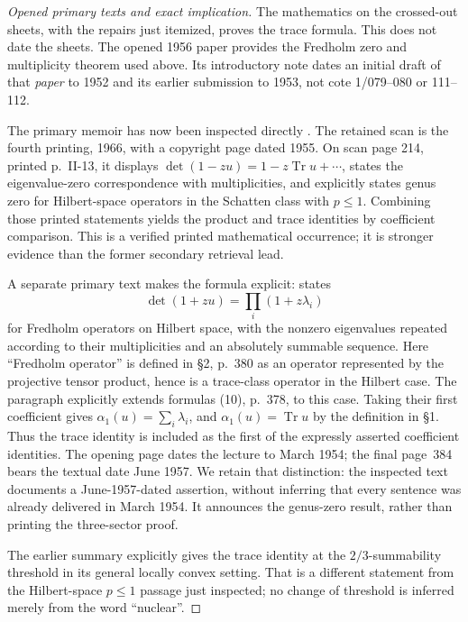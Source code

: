 \begin{proof}[Opened primary texts and exact implication]
The mathematics on the crossed-out sheets, with the repairs just itemized,
proves the trace formula. This does not date the sheets. The opened 1956
paper provides the Fredholm zero and multiplicity theorem used above. Its
introductory note dates an initial draft of that \emph{paper} to 1952 and
its earlier submission to 1953, not cote 1/079--080 or 111--112.

The primary memoir has now been inspected directly
\cite[Chapter II, \S1, no.~4, printed p.~13]{Grothendieck1955Memoir}.
The retained scan is the fourth printing, 1966, with a copyright page dated
1955. On scan page 214, printed p.~II-13, it displays
$\det(1-zu)=1-z\operatorname{Tr}u+\cdots$, states the eigenvalue-zero
correspondence with multiplicities, and explicitly states genus zero for
Hilbert-space operators in the Schatten class with $p\leq1$. Combining
those printed statements yields the product and trace identities by
coefficient comparison. This is a verified printed mathematical occurrence;
it is stronger evidence than the former secondary retrieval lead.

A separate primary text makes the formula explicit:
\cite[\S4(c), printed p.~383, formula (24)]{GrothendieckBourbaki91} states
\[
 \det(1+zu)=\prod_i(1+z\lambda_i)
\]
for Fredholm operators on Hilbert space, with the nonzero eigenvalues
repeated according to their multiplicities and an absolutely summable
sequence. Here ``Fredholm operator'' is defined in \S2, p.~380 as an
operator represented by the projective tensor product, hence is a
trace-class operator in the Hilbert case. The paragraph explicitly extends
formulas (10), p.~378, to this case. Taking their first coefficient gives
$\alpha_1(u)=\sum_i\lambda_i$, and $\alpha_1(u)=\operatorname{Tr}u$
by the definition in \S1. Thus the trace identity is included as the
first of the expressly asserted coefficient identities.
The opening page dates the lecture to March 1954; the final page~384
bears the textual date June 1957. We retain that distinction: the
inspected text documents a June-1957-dated assertion, without inferring
that every sentence was already delivered in March 1954. It announces
the genus-zero result, rather than printing the three-sector proof.

The earlier summary \cite[Chapter II, no.~6, Theorem 8 and Corollary 2,
pp.~107--108]{Grothendieck1952Summary} explicitly gives the trace identity
at the $2/3$-summability threshold in its general locally convex setting.
That is a different statement from the Hilbert-space $p\leq1$ passage
just inspected; no change of threshold is inferred merely from the word
``nuclear''.


\end{proof}
